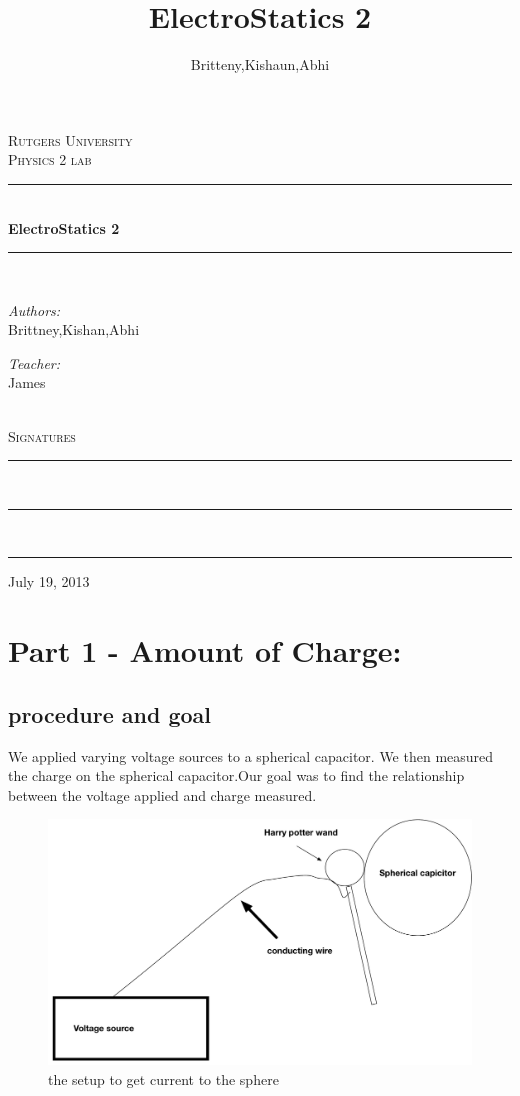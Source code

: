 \documentclass[12pt]{article}
\title{ElectroStatics 2}
\author{Britteny,Kishaun,Abhi}
\begin{document}
\begin{titlepage}
\begin{center}
	\textsc{\LARGE Rutgers University}\\[1.5 cm]
    \textsc{\Large Physics 2 lab}\\[0.5cm]
    \rule{\linewidth}{0.5mm} \\ [.4 cm]
    {\huge \bfseries ElectroStatics 2}\\[.4 cm]
    \rule{\linewidth}{0.5mm} \\ [1.5 cm]
    \begin{minipage}{0.4\textwidth}
	\begin{flushleft} \large
	\emph{Authors:}\\
	Brittney,Kishan,Abhi
	\end{flushleft}
	\end{minipage}
	\begin{minipage}{0.4\textwidth}
	\begin{flushright} \large
	\emph{Teacher:} \\
	James
	\end{flushright}
	\end{minipage}\\[2 cm]
	\textsc{ \Large Signatures} \\[1.7 cm] 
	\rule{10 cm}{0.5mm} \\ [2.0 cm]
	\rule{10 cm}{0.5mm} \\ [2.0 cm]
	\rule{10 cm}{0.5mm}
	\vfill
	{\large {July 19, 2013}}
\end{center}
\end{titlepage}

\section*{Part 1 - Amount of Charge:}

\subsection*{procedure and goal}
	
	 We applied varying voltage sources to a spherical capacitor. We then measured the charge on the spherical capacitor.Our goal was to find the relationship between the voltage applied and charge measured. 
	 \begin{figure}[h]
	 \centering
	 \includegraphics[scale = .4]{diagram1}
	 \caption{the setup to get current to the sphere}
	 \end{figure}
\end{document}
